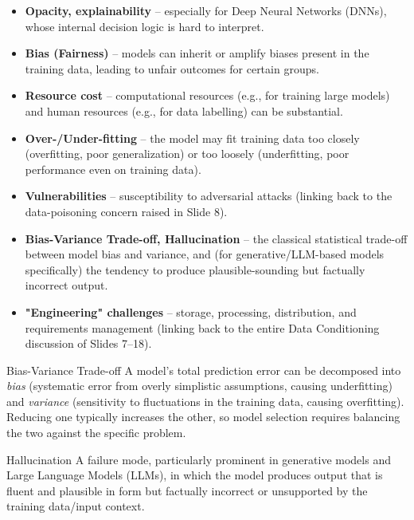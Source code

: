 \begin{itemize}
    \item \textbf{Opacity, explainability} -- especially for Deep Neural Networks (DNNs), whose internal decision logic is hard to interpret.
    \vspace{0.2cm}
    \item \textbf{Bias (Fairness)} -- models can inherit or amplify biases present in the training data, leading to unfair outcomes for certain groups.
    \vspace{0.2cm}
    \item \textbf{Resource cost} -- computational resources (e.g., for training large models) and human resources (e.g., for data labelling) can be substantial.
    \vspace{0.2cm}
    \item \textbf{Over-/Under-fitting} -- the model may fit training data too closely (overfitting, poor generalization) or too loosely (underfitting, poor performance even on training data).
    \vspace{0.2cm}
    \item \textbf{Vulnerabilities} -- susceptibility to adversarial attacks (linking back to the data-poisoning concern raised in Slide 8).
    \vspace{0.2cm}
    \item \textbf{Bias-Variance Trade-off, Hallucination} -- the classical statistical trade-off between model bias and variance, and (for generative/LLM-based models specifically) the tendency to produce plausible-sounding but factually incorrect output.
    \vspace{0.2cm}
    \item \textbf{"Engineering" challenges} -- storage, processing, distribution, and requirements management (linking back to the entire Data Conditioning discussion of Slides 7--18).
\end{itemize}


\begin{defbox}{Bias-Variance Trade-off}
A model's total prediction error can be decomposed into \emph{bias} (systematic error from overly simplistic assumptions, causing underfitting) and \emph{variance} (sensitivity to fluctuations in the training data, causing overfitting). Reducing one typically increases the other, so model selection requires balancing the two against the specific problem.
\end{defbox}

\begin{defbox}{Hallucination}
A failure mode, particularly prominent in generative models and Large Language Models (LLMs), in which the model produces output that is fluent and plausible in form but factually incorrect or unsupported by the training data/input context.
\end{defbox}

